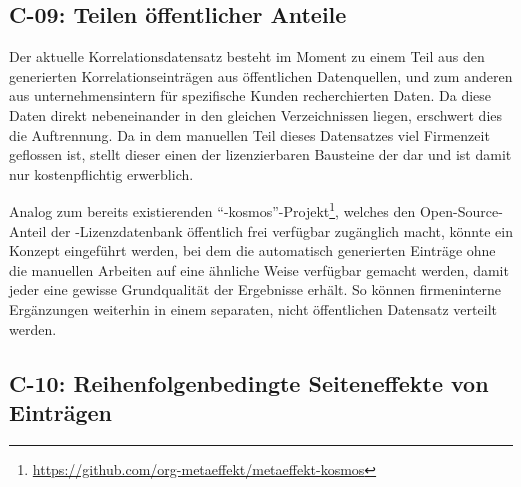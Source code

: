 \subsection{C-09: Teilen öffentlicher Anteile}\label{subsec:c-09-sharing-of-public-data}


Der aktuelle Korrelationsdatensatz besteht im Moment zu einem Teil aus den generierten Korrelationseinträgen aus öffentlichen Datenquellen, und zum anderen aus unternehmensintern für spezifische Kunden recherchierten Daten.
Da diese Daten direkt nebeneinander in den gleichen Verzeichnissen liegen, erschwert dies die Auftrennung.
Da in dem manuellen Teil dieses Datensatzes viel Firmenzeit geflossen ist, stellt dieser einen der lizenzierbaren Bausteine der \metaeffektsp dar und ist damit nur kostenpflichtig erwerblich.

Analog zum bereits existierenden \enquote{\metaeffekt-kosmos}-Projekt\footnote{\url{https://github.com/org-metaeffekt/metaeffekt-kosmos}}, welches den Open-Source-Anteil der \metaeffekt-Lizenzdatenbank öffentlich frei verfügbar zugänglich macht, könnte ein Konzept eingeführt werden, bei dem die automatisch generierten Einträge ohne die manuellen Arbeiten auf eine ähnliche Weise verfügbar gemacht werden, damit jeder eine gewisse Grundqualität der Ergebnisse erhält.
So können firmeninterne Ergänzungen weiterhin in einem separaten, nicht öffentlichen Datensatz verteilt werden.

\subsection{C-10: Reihenfolgenbedingte Seiteneffekte von Einträgen}\label{subsec:c-10-order-dependency}


